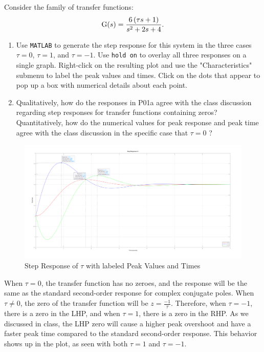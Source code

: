 \begin{hwkProblem}{1}{}

	Consider the family of transfer functions: \[ \func{G}[s] = \frac{6 \left(\tau s + 1\right)}{s^{2} + 2s + 4}. \]
	\begin{enumerate}
		\item Use \lstinline{MATLAB} to generate the step response for this system in the three cases \(\tau=0\), \(\tau=1\), and \(\tau=-1\). Use \lstinline{hold on} to overlay all three responses on a single graph. Right-click on the resulting plot and use the "Characteristics" submenu to label the peak values and times. Click on the dots that appear to pop up a box with numerical details about each point.
		\item Qualitatively, how do the responses in P01a agree with the class discussion regarding step responses for transfer functions containing zeros? Quantitatively, how do the numerical values for peak response and peak time agree with the class discussion in the specific case that \(\tau=0\) ?
	\end{enumerate}

	\hwkSol{}

	\hwkPart{}

	\begin{figure}[H]
		\begin{center}
			\includegraphics[width=\textwidth]{./images/s01a.png}
		\end{center}
		\caption{Step Response of \( \tau \) with labeled Peak Values and Times}\label{fig:s01a}
	\end{figure}

	\hwkPart{}

	When \( \tau = 0 \), the transfer function has no zeroes, and the response will be the same as the standard second-order response for complex conjugate poles. When \( \tau \neq 0 \), the zero of the transfer function will be \( z = \frac{-1}{\tau} \). Therefore, when \( \tau = -1 \), there is a zero in the LHP, and when \( \tau = 1 \), there is a zero in the RHP. As we discussed in class, the LHP zero will cause a higher peak overshoot and have a faster peak time compared to the standard second-order response. This behavior shows up in the plot, as seen with both \( \tau = 1 \) and \( \tau = -1 \).


\end{hwkProblem}
